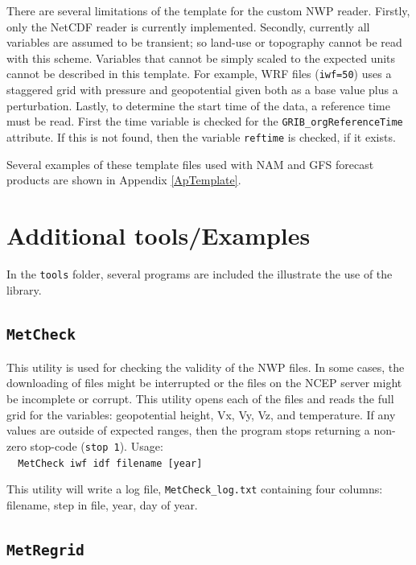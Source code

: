 \documentclass[11pt]{article}   %
\begin{document}
There are several limitations of the template for the custom NWP reader.  Firstly, only
the NetCDF reader is currently implemented.  Secondly, currently all variables are
assumed to be transient; so land-use or topography cannot be read with this scheme.
Variables that cannot be simply scaled to the expected units cannot be 
described in this template.  For example, WRF files (\verb|iwf=50|) uses a staggered
grid with pressure and geopotential given both as a base value plus a perturbation.
Lastly, to determine the start time of the data, a reference time must be read.  First
the time variable is checked for the \texttt{GRIB\_orgReferenceTime} attribute.  If this
is not found, then the variable \texttt{reftime} is checked, if it exists.

Several examples of these template files used with NAM and GFS
forecast products are shown in Appendix \ref{ApTemplate}.

\section{Additional tools/Examples}\label{SecTools}
In the \texttt{tools} folder, several programs are included the illustrate the
use of the library.

\subsection{\texttt{MetCheck}}

This utility is used for checking the validity of the NWP files.  In some
cases, the downloading of files might be interrupted or the files on the
NCEP server might be incomplete or corrupt.  This utility opens each of the files
and reads the full grid for the variables: geopotential height, Vx, Vy, Vz, and
temperature.  If any values are outside of expected ranges, then the program
stops returning a non-zero stop-code (\verb|stop 1|).
Usage:\\
\verb|  MetCheck iwf idf filename [year]|

This utility will write a log file, \texttt{MetCheck\_log.txt} containing four columns:
filename, step in file, year, day of year.
\subsection{\texttt{MetRegrid}}
\end{document}
